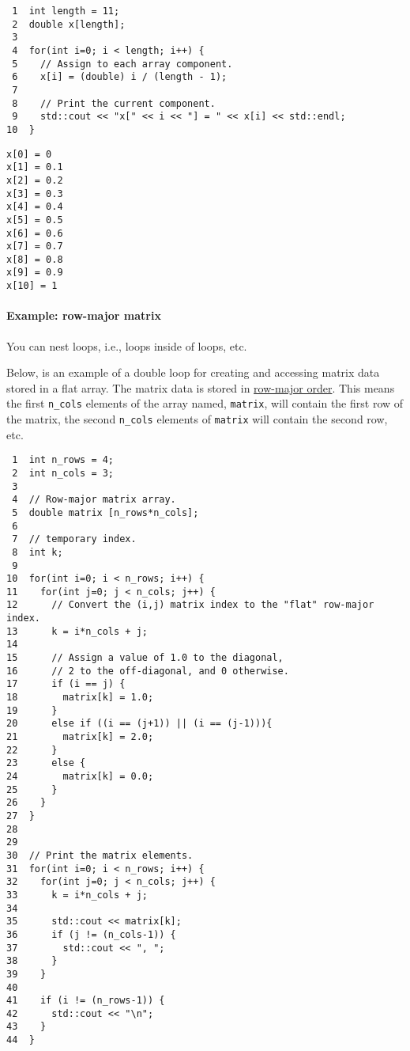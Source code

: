 \documentclass[11pt]{article}
\begin{document}
\begin{verbatim}
 1  int length = 11;
 2  double x[length];
 3  
 4  for(int i=0; i < length; i++) {
 5    // Assign to each array component.
 6    x[i] = (double) i / (length - 1);
 7  
 8    // Print the current component.
 9    std::cout << "x[" << i << "] = " << x[i] << std::endl;
10  }
\end{verbatim}

\begin{verbatim}
x[0] = 0
x[1] = 0.1
x[2] = 0.2
x[3] = 0.3
x[4] = 0.4
x[5] = 0.5
x[6] = 0.6
x[7] = 0.7
x[8] = 0.8
x[9] = 0.9
x[10] = 1
\end{verbatim}


\paragraph{Example: row-major matrix}
\label{sec:orgheadline27}

You can nest loops, i.e., loops inside of loops, etc.

Below, is an example of a double loop for creating and accessing 
matrix data stored in a flat array. The matrix data is stored in 
\href{https://en.wikipedia.org/wiki/Row-major-order}{row-major order}. This means the first \texttt{n\_cols} elements of the 
array named, \texttt{matrix}, will contain the first row of the matrix, 
the second \texttt{n\_cols} elements of \texttt{matrix} will contain the second row, etc.

\begin{verbatim}
 1  int n_rows = 4;
 2  int n_cols = 3;
 3  
 4  // Row-major matrix array.
 5  double matrix [n_rows*n_cols];
 6  
 7  // temporary index.
 8  int k;
 9  
10  for(int i=0; i < n_rows; i++) {
11    for(int j=0; j < n_cols; j++) {
12      // Convert the (i,j) matrix index to the "flat" row-major index.
13      k = i*n_cols + j;
14  
15      // Assign a value of 1.0 to the diagonal,
16      // 2 to the off-diagonal, and 0 otherwise.
17      if (i == j) {
18        matrix[k] = 1.0;
19      }
20      else if ((i == (j+1)) || (i == (j-1))){
21        matrix[k] = 2.0;
22      }
23      else {
24        matrix[k] = 0.0;
25      }
26    }
27  }
28  
29  
30  // Print the matrix elements.
31  for(int i=0; i < n_rows; i++) {
32    for(int j=0; j < n_cols; j++) {
33      k = i*n_cols + j;
34  
35      std::cout << matrix[k];
36      if (j != (n_cols-1)) {
37        std::cout << ", ";
38      }
39    }
40  
41    if (i != (n_rows-1)) {
42      std::cout << "\n";
43    }
44  }
\end{verbatim}
\end{document}
